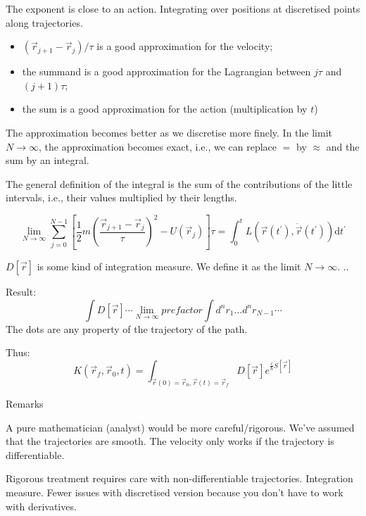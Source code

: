 \documentclass[a4paper]{extarticle}
\newcommand{\tpr}{t^\prime}
\newcommand{\dtpr}{\text{d}t^\prime}
\newcommand{\ihbar}{\frac{i}{\hbar}}
\newcommand{\propagator}{K(\vec{r}_f, \vec{r}_0, t)}
\begin{document}
The exponent is close to an action.
Integrating over positions at discretised points along trajectories.

\begin{itemize}
  \item $(\vec{r}_{j + 1} - \vec{r}_j)/\tau$ is a good approximation for the velocity;
  \item the summand is a good approximation for the Lagrangian between $j\tau$ and $(j + 1)\tau$;
  \item the sum is a good approximation for the action (multiplication by $t$)
\end{itemize}

The approximation becomes better as we discretise more finely.
In the limit $N \to \infty$, the approximation becomes exact, i.e., we can
replace $=$ by $\approx$ and the sum by an integral.

The general definition of the integral is the sum of the contributions of the
little intervals, i.e., their values multiplied by their lengths.

\begin{equation}
  \lim_{N \to \infty} \sum_{j = 0}^{N - 1} \left[
    \frac{1}{2}m\left( \frac{\vec{r}_{j + 1} - \vec{r}_{j}}{\tau} \right)^2 -
    U(\vec{r}_j)
    \right] \tau
  = \int_0^t L(\vec{r}(\tpr), \dot{\vec{r}}(\tpr)) \dtpr
\end{equation}

$D\left[\vec{r}\right]$ is some kind of integration measure.
We define it as the limit $N \to \infty$.
..

Result:
\begin{equation}
  \int D\left[\vec{r}\right] \cdots
  \lim_{N \to \infty} prefactor \int d^n r_1 \dots d^n r_{N - 1} \cdots
\end{equation}
The dots are any property of the trajectory of the path.

Thus:
\begin{equation}
  \propagator = \int_{\vec{r}(0) = \vec{r}_0, \vec{r}(t) = \vec{r}_f}
  D\left[\vec{r}\right] e^{\ihbar S\left[\vec{r}\right]}
\end{equation}

Remarks

A pure mathematician (analyst)
would be more careful/rigorous.
We've assumed that the trajectories are smooth.
The velocity only works if the trajectory is differentiable.

Rigorous treatment requires care with non-differentiable trajectories.
Integration measure.
Fewer issues with discretised version because you don't have to work with
derivatives.
\end{document}
